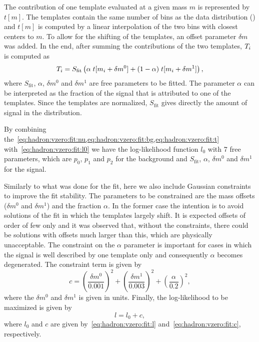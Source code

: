 The contribution of one template evaluated at a given
mass $m$ is represented by $t[m]$. The templates contain
the same number of bins as the data distribution (\nmass)
and $t[m]$ is computed by a linear interpolation of the two bins
with closest centers to $m$.
To allow for the shifting of the templates, an offset parameter $\delta m$
was added. In the end,
after summing the contributions of the two templates,
$T_i$ is computed as
\begin{equation}
  T_i = S_\text{fit}\left(\alpha\; t[m_i+\delta m^0]+ (1-\alpha)\;t[m_i+\delta m^1]\right),
  \label{eq:hadron:vzero:fit:t}
\end{equation}
where $S_\text{fit}$, $\alpha$, $\delta m^0$ and $\delta m^1$ are
free parameters to be fitted. The parameter $\alpha$ can be interpreted
as the fraction of the signal that is attributed to one of the templates.
Since the templates are normalized, $S_\text{fit}$ gives
directly the amount of signal in the distribution.

By combining the~\cref{eq:hadron:vzero:fit:nu,eq:hadron:vzero:fit:bg,eq:hadron:vzero:fit:t}
with~\cref{eq:hadron:vzero:fit:l0} we have the log-likelihood function $l_0$
with 7 free parameters, which are $p_0$, $p_1$ and $p_2$
for the background and $S_\text{fit}$, $\alpha$, $\delta m^0$ and $\delta m^1$
for the signal.

Similarly to what was done for the \dedx fit,
here we also include Gaussian constraints to improve
the fit stability. The parameters to be constrained are
the mass offsets ($\delta m^0$ and $\delta m^1$) and the fraction
$\alpha$. In the former case the intention is to avoid
solutions of the fit in which the templates largely shift.
It is expected offsets of order of few \MeVc only and it was observed
that, without the constraints, there could be solutions with
offsets much larger than this, which are physically unacceptable.
The constraint on the $\alpha$ parameter is important
for cases in which the signal is well described by one
template only and consequently $\alpha$ becomes
degenerated. The constraint term is given by
\begin{equation}
  c = \left(\frac{\delta m^0}{0.001}\right)^2+\left(\frac{\delta m^1}{0.003}\right)^2
  +\left(\frac{\alpha}{0.2}\right)^2,
  \label{eq:hadron:vzero:fit:c}
\end{equation}
where the $\delta m^0$ and $\delta m^1$ is given in \GeVcc units.
Finally, the log-likelihood to be maximized is given by
\begin{equation}
  l = l_0 +c,
  \label{eq:hadron:vzero:fit:l}
\end{equation}
where $l_0$ and $c$ are given by~\cref{eq:hadron:vzero:fit:l}
and~\cref{eq:hadron:vzero:fit:c}, respectively.

